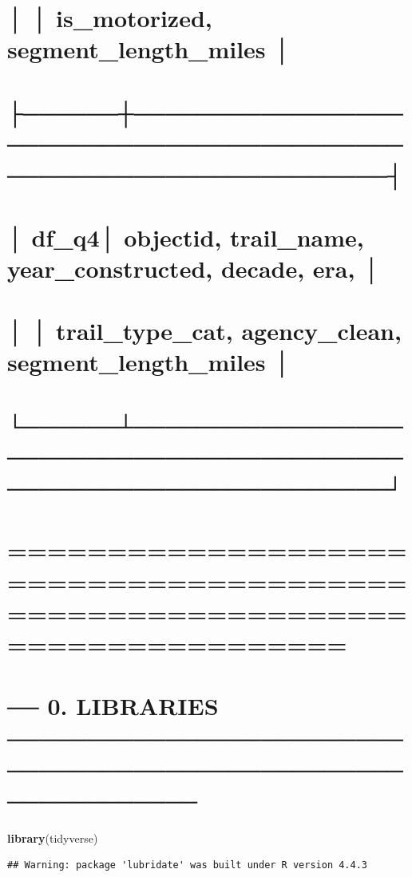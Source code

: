 \documentclass[
]{article}
\newenvironment{Shaded}{\begin{snugshade}}{\end{snugshade}}
\newcommand{\FunctionTok}[1]{\textcolor[rgb]{0.13,0.29,0.53}{\textbf{#1}}}
\newcommand{\NormalTok}[1]{#1}
\begin{document}
\section{│ │ is\_motorized, segment\_length\_miles
│}\label{is_motorized-segment_length_miles}

\section{├──────┼──────────────────────────────────────────────────────────────────┤}\label{section-5}

\section{│ df\_q4│ objectid, trail\_name, year\_constructed, decade,
era, │}\label{df_q4-objectid-trail_name-year_constructed-decade-era}

\section{│ │ trail\_type\_cat, agency\_clean, segment\_length\_miles
│}\label{trail_type_cat-agency_clean-segment_length_miles}

\section{└──────┴──────────────────────────────────────────────────────────────────┘}\label{section-6}

\section{=============================================================================}\label{section-7}

\section{── 0. LIBRARIES
──────────────────────────────────────────────────────────────}\label{libraries}

\begin{Shaded}
\begin{Highlighting}[]
\FunctionTok{library}\NormalTok{(tidyverse)}
\end{Highlighting}
\end{Shaded}

\begin{verbatim}
## Warning: package 'lubridate' was built under R version 4.4.3
\end{verbatim}
\end{document}
